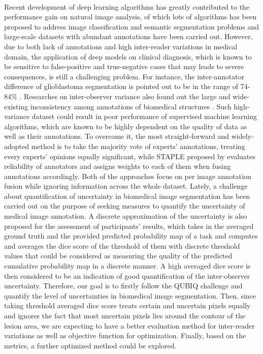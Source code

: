 \documentclass[12pt]{extarticle}
\begin{document}
\paragraph{}
Recent development of deep learning algorithms has greatly contributed to
the performance gain on natural image analysis, of which lots
of algorithms has been proposed to address image classification and semantic
segmentation problems and large-scale datasets with abundant annotations have been
carried out\cite{nair_precup_arnold_arbel_2020}.
However, due to
both lack of annotations and high inter-reader variations\cite{zhang2020disentangling}
in medical domain, the application of deep models on clinical diagnosis,
which is known to be sensitive to false-positive and true-negative cases that may leads
to severe consequences, is still a challenging problem.
For instance, the inter-annotator difference of glioblastoma segmentation
is pointed out to be in the range of 74-84\% \cite{6975210}.
Researches on inter-observer variance also found out
the large and wide-existing inconsistency among annotations of biomedical structures
\cite{Variability2019}\cite{interobserver2018}. Such high-variance dataset 
could result in poor performance of supervised machine learning algorithms,
which are known to be highly dependent on the quality of data as well as their annotations.
To overcome it, the most straight-forward and widely-adopted method 
is to take the majority vote of experts' annotations, treating every 
experts' opinions equally significant\cite{6975210}, while STAPLE proposed by \cite{STAPLE} 
evaluates reliability of annotators and assigns weights to each of them when 
fusing annotations accordingly. Both of the approaches focus on per image annotation fusion
while ignoring information across the whole dataset\cite{zhang2020disentangling}.
Lately, a challenge about quantification of uncertainty 
in biomedical image segmentation has been carried
out on the purpose of seeking measures to quantify the uncertainty of 
medical image annotation. A discrete approximation of the uncertainty is also
proposed for the assessment of participants' results, which
takes in the averaged ground truth and the provided predicted probability map of a task
and computes and averages the dice score of the threshold of them with
discrete threshold values\cite{qubiq} that could be considered as 
measuring the quality of the predicted cumulative probability map in a discrete manner. 
A high averaged dice score is then considered to be an indication of 
good quantification of the inter-observer uncertainty.
Therefore, our goal is to firstly follow the QUBIQ challenge and quantify the level of 
uncertainties in biomedical image segmentation. 
Then, since taking threshold averaged dice score treats certain and uncertain pixels equally 
and ignores the fact that most uncertain pixels lies around 
the contour of the lesion area, we are expecting to have a
better evaluation method for inter-reader variations as well as objective function for 
optimization. Finally, based on the metrics, a further
optimized method could be explored.
\end{document}
